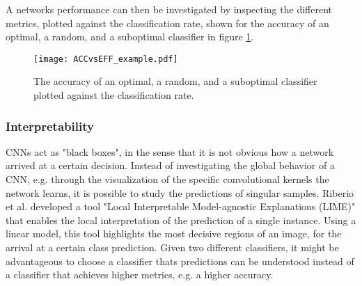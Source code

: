 A networks performance can then be investigated by inspecting the different metrics, plotted against the classification rate, shown for the accuracy of an optimal, a random, and a suboptimal classifier in figure \ref{fig:PURvsEFF}.

\begin{figure}[H]
\begin{center}
\texttt{[image: ACCvsEFF\_example.pdf]}

\end{center}
\caption{The accuracy of an optimal, a random, and a suboptimal classifier plotted against the classification rate.}
\label{fig:PURvsEFF}
\end{figure}

%
%

\subsubsection{Interpretability}
\label{sec:LIME}
CNNs act as "black boxes", in the sense that it is not obvious how a network arrived at a certain decision. Instead of investigating the global behavior of a CNN, e.g. through the visualization of the specific convolutional kernels the network learns, it is possible to study the predictions of singular samples. Riberio et al. developed a tool "Local Interpretable Model-agnostic Explanations (LIME)" \cite{Ribeiro2016} that enables the local interpretation of the prediction of a single instance. Using a linear model, this tool highlights the most decisive regions of an image, for the arrival at a certain class prediction. Given two different classifiers, it might be advantageous to choose a classifier thats predictions can be understood instead of a classifier that achieves higher metrics, e.g. a higher accuracy. 

